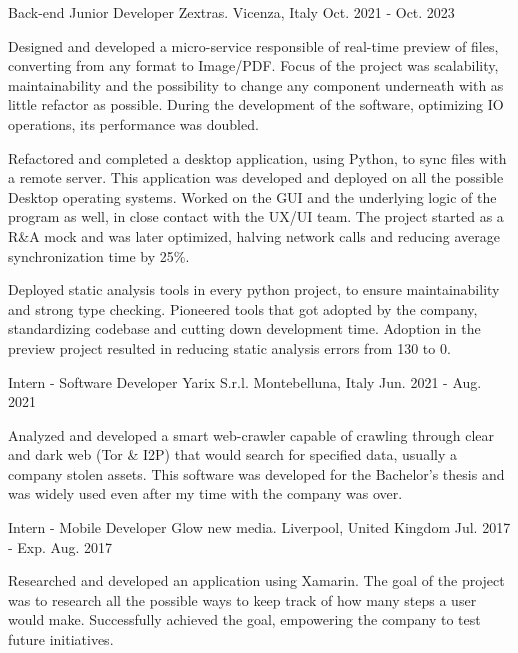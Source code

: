 \begin{cventries}
  \cventry
  {Back-end Junior Developer} %
  {Zextras.} %
  {Vicenza, Italy} %
  {Oct. 2021 - Oct. 2023} %
  {
    \begin{cvitems} %
    \item {Designed and developed a micro-service responsible of
        real-time preview of files, converting from any format to
        Image/PDF. Focus of the project was scalability,
        maintainability and the possibility to change any component
        underneath with as little refactor as possible. During the
        development of the software, optimizing IO operations, its
      performance was doubled.}
    \item {Refactored and completed a desktop application, using
        Python, to sync files with a remote server. This application
        was developed and deployed on all the possible Desktop
        operating systems. Worked on the GUI and the underlying logic
        of the program as well, in close contact with the UX/UI team.
        The project started as a R\&A mock and was later optimized,
      halving network calls and reducing average synchronization time by 25\%.}
    \item {Deployed static analysis tools in every python project, to
        ensure maintainability and strong type checking. Pioneered
        tools that got adopted by the company, standardizing codebase
        and cutting down development time. Adoption in the preview
      project resulted in reducing static analysis errors from 130 to 0.}
    \end{cvitems}
  }

  \cventry
  {Intern - Software Developer} %
  {Yarix S.r.l.} %
  {Montebelluna, Italy} %
  {Jun. 2021 - Aug. 2021} %
  {
    \begin{cvitems} %
    \item {Analyzed and developed a smart web-crawler capable of
        crawling through clear and dark web (Tor \& I2P) that would
        search for specified data, usually a company stolen assets.
        This software was developed for the Bachelor's thesis and was
      widely used even after my time with the company was over.}
    \end{cvitems}
  }

  \cventry
  {Intern - Mobile Developer} %
  {Glow new media.} %
  {Liverpool, United Kingdom} %
  {Jul. 2017 - Exp. Aug. 2017} %
  {
    \begin{cvitems} %
    \item {Researched and developed an application using Xamarin. The
        goal of the project was to research all the possible ways to
        keep track of how many steps a user would make. Successfully
      achieved the goal, empowering the company to test future initiatives.}
    \end{cvitems}
  }

\end{cventries}
